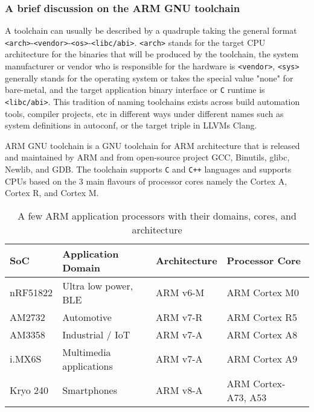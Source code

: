 \subsubsection{A brief discussion on the ARM GNU toolchain}


A toolchain can usually be described by a quadruple taking the general format \texttt{<arch>}-\texttt{<vendor>}-\texttt{<os>}-\texttt{<libc/abi>}. \texttt{<arch>} stands for the target CPU architecture for the binaries that will be produced by the toolchain, the system manufacturer or vendor who is responsible for the hardware is \texttt{<vendor>}, \texttt{<sys>} generally stands for the operating system or takes the special value "none" for bare-metal, and the target application binary interface or \texttt{C} runtime is \texttt{<libc/abi>}. This tradition of naming toolchains exists across build automation tools, compiler projects, etc in different ways under different names such as system definitions in autoconf, or the target triple in LLVM\textquotesingle s Clang.

ARM GNU toolchain is a GNU toolchain for ARM architecture that is released and maintained by ARM and from open-source project GCC, Binutils, glibc, Newlib, and GDB. The toolchain supports \texttt{C} and \texttt{C++} languages and supports CPUs based on the 3 main flavours of processor cores namely the Cortex A, Cortex R, and Cortex M.

\begin{table}[h]
	\centering
	\begin{tabular}{ |p{5em}|p{10em}|p{7em}|p{10em}| }
		\hline
			\textbf{SoC} &
			\textbf{Application Domain} &
			\textbf{Architecture} &
			\textbf{Processor Core} \\
		\hline
			nRF51822 &
			Ultra low power, BLE &
			ARM v6-M &
			ARM Cortex M0 \\
		\hline
			AM2732 &
			Automotive &
			ARM v7-R &
			ARM Cortex R5 \\
		\hline
			AM3358 &
			Industrial / IoT &
			ARM v7-A &
			ARM Cortex A8 \\
		\hline
			i.MX6S &
			Multimedia applications &
			ARM v7-A &
			ARM Cortex A9 \\
		\hline
			Kryo 240 &
			Smartphones &
			ARM v8-A &
			ARM Cortex-A73, A53 \\
		\hline
	\end{tabular}
	\caption{A few ARM application processors with their domains, cores, and architecture}
	\label{table:arm}
\end{table}

